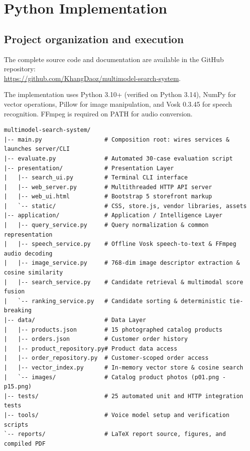 \documentclass[12pt,a4paper]{article}
\begin{document}
\FloatBarrier
\section{Python Implementation}\label{sec:implementation}

\subsection{Project organization and execution}
The complete source code and documentation are available in the GitHub repository:\\
\url{https://github.com/KhangDaoz/multimodel-search-system}.

The implementation uses Python 3.10+ (verified on Python 3.14), NumPy for vector operations, Pillow for image manipulation, and Vosk 0.3.45 for speech recognition. FFmpeg is required on PATH for audio conversion.

\begin{lstlisting}[caption={Source code directory layout.}]
multimodel-search-system/
|-- main.py                  # Composition root: wires services & launches server/CLI
|-- evaluate.py              # Automated 30-case evaluation script
|-- presentation/            # Presentation Layer
|   |-- search_ui.py         # Terminal CLI interface
|   |-- web_server.py        # Multithreaded HTTP API server
|   |-- web_ui.html          # Bootstrap 5 storefront markup
|   `-- static/              # CSS, store.js, vendor libraries, assets
|-- application/             # Application / Intelligence Layer
|   |-- query_service.py     # Query normalization & common representation
|   |-- speech_service.py    # Offline Vosk speech-to-text & FFmpeg audio decoding
|   |-- image_service.py     # 768-dim image descriptor extraction & cosine similarity
|   |-- search_service.py    # Candidate retrieval & multimodal score fusion
|   `-- ranking_service.py   # Candidate sorting & deterministic tie-breaking
|-- data/                    # Data Layer
|   |-- products.json        # 15 photographed catalog products
|   |-- orders.json          # Customer order history
|   |-- product_repository.py# Product data access
|   |-- order_repository.py  # Customer-scoped order access
|   |-- vector_index.py      # In-memory vector store & cosine search
|   `-- images/              # Catalog product photos (p01.png - p15.png)
|-- tests/                   # 25 automated unit and HTTP integration tests
|-- tools/                   # Voice model setup and verification scripts
`-- reports/                 # LaTeX report source, figures, and compiled PDF
\end{lstlisting}
\end{document}

